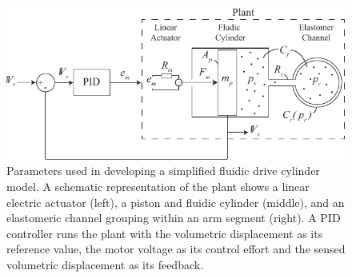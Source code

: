 \begin{figure}[htb]
\centering
   \includegraphics[width=\columnwidth]{Figures/power/CylinderModel}
   \caption[Parameters used in developing a simplified fluidic drive cylinder model.]{Parameters used in developing a simplified fluidic drive cylinder model. A schematic representation of the plant shows a linear electric actuator (left), a piston and fluidic cylinder (middle), and an elastomeric channel grouping within an arm segment (right). A PID controller runs the plant with the volumetric displacement as its reference value, the motor voltage as its control effort and the sensed volumetric displacement as its feedback.}
   \label{fig:CylinderModel}
\end{figure}

